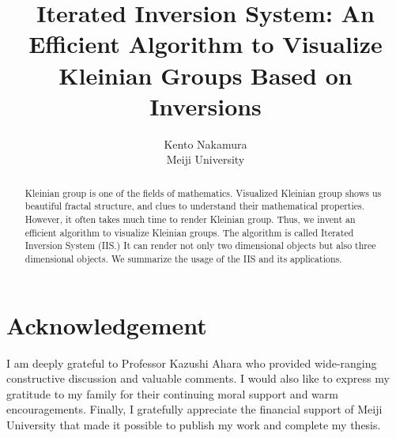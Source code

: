 \documentclass[uplatex, dvipdfmx]{article}
\title{ Iterated Inversion System: An Efficient Algorithm to Visualize Kleinian Groups Based on Inversions }
\author{ Kento Nakamura\\
Meiji University\\
}
\date{}
\begin{document}
\maketitle
\pagestyle{plain}


\begin{abstract}
 Kleinian group is one of the fields of mathematics. Visualized
 Kleinian group shows us beautiful fractal structure, and clues to
 understand their mathematical properties.
 However, it often takes much time to render Kleinian group.
 Thus, we invent an efficient algorithm to visualize Kleinian groups.
 The algorithm is called Iterated Inversion System
 (IIS.) It can render not only two dimensional objects but also three
 dimensional objects.
 We summarize the usage of the IIS and its applications.
\end{abstract}

\clearpage

\tableofcontents

\clearpage











\section*{Acknowledgement}

I am deeply grateful to Professor Kazushi Ahara who provided
wide-ranging constructive discussion and valuable comments.
I would also like to express my gratitude to my family for their
continuing moral support and warm encouragements.
Finally, I gratefully appreciate the financial support of Meiji
University that made it possible to publish my work and  complete my
thesis.

\printbibliography
\end{document}
